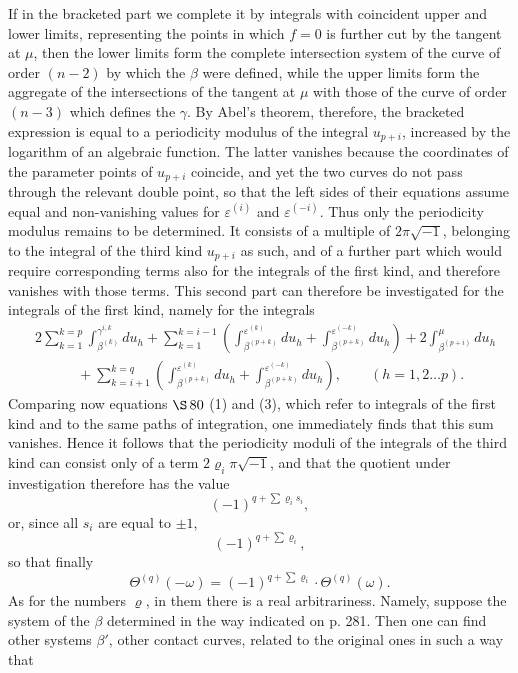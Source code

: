 \documentclass[10pt]{article}
\begin{document}
If in the bracketed part we complete it by integrals with coincident upper and lower limits, representing the points in which \(f=0\) is further cut by the tangent at \(\mu\), then the lower limits form the complete intersection system of the curve of order \((n-2)\) by which the \(\beta\) were defined, while the upper limits form the aggregate of the intersections of the tangent at \(\mu\) with those of the curve of order \((n-3)\) which defines the \(\gamma\). By Abel's theorem, therefore, the bracketed expression is equal to a periodicity modulus of the integral \(u_{p+i}\), increased by the logarithm of an algebraic function. The latter vanishes because the coordinates of the parameter points of \(u_{p+i}\) coincide, and yet the two curves do not pass through the relevant double point, so that the left sides of their equations assume equal and non-vanishing values for \(\varepsilon^{(i)}\) and \(\varepsilon^{(-i)}\). Thus only the periodicity modulus remains to be determined. It consists of a multiple of \(2\pi\sqrt{-1}\), belonging to the integral of the third kind \(u_{p+i}\) as such, and of a further part which would require corresponding terms also for the integrals of the first kind, and therefore vanishes with those terms. This second part can therefore be investigated for the integrals of the first kind, namely for the integrals
\[
\begin{aligned}
&2\sum_{k=1}^{k=p}\int_{\beta^{(k)}}^{\gamma^{i,k}}du_h
+\sum_{k=1}^{k=i-1}\left(\int_{\beta^{(p+k)}}^{\varepsilon^{(k)}}du_h
+\int_{\beta^{(p+k)}}^{\varepsilon^{(-k)}}du_h\right)
+2\int_{\beta^{(p+i)}}^{\mu}du_h\\
&\hspace{3em}
+\sum_{k=i+1}^{k=q}\left(\int_{\beta^{(p+k)}}^{\varepsilon^{(k)}}du_h
+\int_{\beta^{(p+k)}}^{\varepsilon^{(-k)}}du_h\right),
\qquad (h=1,2\ldots p).
\end{aligned}
\]
Comparing now equations \(\S\,80\) (1) and (3), which refer to integrals of the first kind and to the same paths of integration, one immediately finds that this sum vanishes. Hence it follows that the periodicity moduli of the integrals of the third kind can consist only of a term \(2\varrho_i\pi\sqrt{-1}\), and that the quotient under investigation therefore has the value
\[
(-1)^{q+\sum\varrho_i s_i},
\]
or, since all \(s_i\) are equal to \(\pm1\),
\[
(-1)^{q+\sum\varrho_i},
\]
so that finally
\[
\Theta^{(q)}(-\omega)=(-1)^{q+\sum\varrho_i}\cdot\Theta^{(q)}(\omega).
\]
As for the numbers \(\varrho\), in them there is a real arbitrariness. Namely, suppose the system of the \(\beta\) determined in the way indicated on p. 281. Then one can find other systems \(\beta'\), other contact curves, related to the original ones in such a way that
\end{document}
